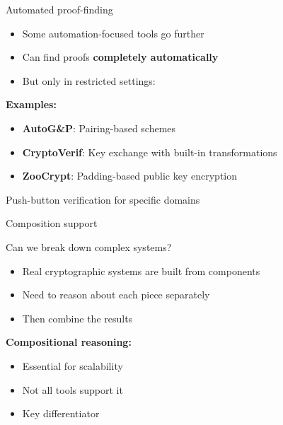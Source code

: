 \documentclass[aspectratio=169, lualatex, handout]{beamer}
\begin{document}
\begin{frame}{Automated proof-finding}
	\begin{itemize}
		\item Some automation-focused tools go further
		\item Can find proofs \textbf{completely automatically}
		\item But only in restricted settings:
	\end{itemize}
	\vspace{0.5em}
	\textbf{Examples:}
	\begin{itemize}
		\item \textbf{AutoG\&P}: Pairing-based schemes
		\item \textbf{CryptoVerif}: Key exchange with built-in transformations
		\item \textbf{ZooCrypt}: Padding-based public key encryption
	\end{itemize}
	\vspace{0.5em}
	\begin{center}
		Push-button verification for specific domains
	\end{center}
\end{frame}

\begin{frame}{Composition support}
	\begin{center}
		\Large
		Can we break down complex systems?
	\end{center}
	\vspace{1em}
	\begin{itemize}
		\item Real cryptographic systems are built from components
		\item Need to reason about each piece separately
		\item Then combine the results
	\end{itemize}
	\vspace{0.5em}
	\textbf{Compositional reasoning:}
	\begin{itemize}
		\item Essential for scalability
		\item Not all tools support it
		\item Key differentiator
	\end{itemize}
\end{frame}
\end{document}
